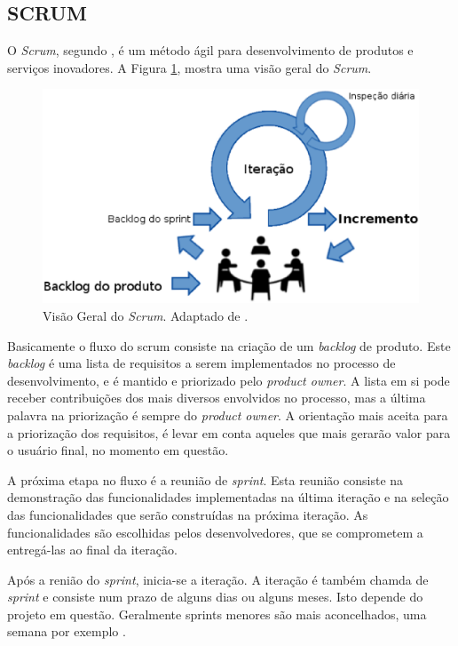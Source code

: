 \subsection{SCRUM}

O \emph{Scrum}, segundo \cite{Rubin2012}, é um método ágil para desenvolvimento de produtos e serviços inovadores. 
A Figura \ref{scrum_geral}, mostra uma visão geral do \emph{Scrum}.
\begin{figure}[ht]
	\centering
	\includegraphics[width=15cm]{figuras/scrum_geral.eps}
	\caption{Visão Geral do \emph{Scrum}. Adaptado de \cite{Schwaber2004}.}
	\label{scrum_geral}
\end{figure}

Basicamente o fluxo do scrum consiste na criação de um \emph{backlog} de produto. 
Este \emph{backlog} é uma lista de requisitos a serem implementados no processo de desenvolvimento, e é mantido e priorizado pelo \emph{product owner}. 
A lista em si pode receber contribuições dos mais diversos envolvidos no processo, mas a última palavra na priorização é sempre do \emph{product owner}.
A orientação mais aceita para a priorização dos requisitos, é levar em conta aqueles que mais gerarão valor para o usuário final, no momento em questão.

A próxima etapa no fluxo é a reunião de \emph{sprint}. 
Esta reunião consiste na demonstração das funcionalidades implementadas na última iteração e na seleção das funcionalidades que serão construídas na próxima iteração.
As funcionalidades são escolhidas pelos desenvolvedores, que se comprometem a entregá-las ao final da iteração.

Após a renião do \emph{sprint}, inicia-se a iteração. A iteração é também chamda de \emph{sprint} e consiste num prazo de alguns dias ou alguns meses. Isto depende do projeto em questão. Geralmente sprints menores são mais aconcelhados, uma semana por exemplo \cite{Schwaber2004}.

